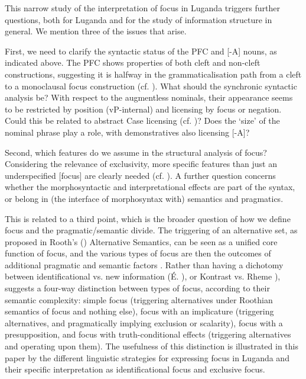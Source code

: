 \documentclass[output=paper]{langsci/langscibook}
\begin{document}
This narrow study of the interpretation of focus in Luganda triggers further questions, both for Luganda and for the study of information structure in general. We mention three of the issues that arise.

First, we need to clarify the syntactic status of the PFC and [-A] nouns, as indicated above. The PFC shows properties of both cleft and non-cleft constructions, suggesting it is halfway in the grammaticalisation path from a cleft to a monoclausal focus construction (cf. \citealt{HeineReh1983,HarrisCampbell1995,VanderWalManiacky2015}). What should the synchronic syntactic analysis be? With respect to the augmentless nominals, their appearance seems to be restricted by position (vP-internal) and licensing by focus or negation. Could this be related to abstract Case licensing (cf. \citealt{Halpert2012,Halpert2013,CarstensMletshe2013,CarstensMletshe2015})? Does the ‘size’ of the nominal phrase play a role, with demonstratives also licensing [-A]?

Second, which features do we assume in the structural analysis of focus? Considering the relevance of exclusivity, more specific features than just an underspecified [focus] are clearly needed (cf. \citealt{NeelemanEtAl2009}). A further question concerns whether the morphosyntactic and interpretational effects are part of the syntax, or belong in (the interface of morphosyntax with) semantics and pragmatics.

This is related to a third point, which is the broader question of how we define focus and the pragmatic/semantic divide. The triggering of an alternative set, as proposed in Rooth’s (\citeyear*{Rooth1985,Rooth1992,Rooth1996}) Alternative Semantics, can be seen as a unified core function of focus, and the various types of focus are then the outcomes of additional pragmatic and semantic factors \citep{ZimmermannOnea2011}. Rather than having a dichotomy between identificational vs. new information (É. \citealt{Kiss1998}), or Kontrast vs. Rheme \citep{VallduviVilkuna1998}), \citet{Bazalgette2015} suggests a four-way distinction between types of focus, according to their semantic complexity: simple focus (triggering alternatives under Roothian semantics of focus and nothing else), focus with an implicature (triggering alternatives, and pragmatically implying exclusion or scalarity), focus with a presupposition, and focus with truth-conditional effects (triggering alternatives and operating upon them). The usefulness of this distinction is illustrated in this paper by the different linguistic strategies for expressing focus in Luganda and their specific interpretation as identificational focus and exclusive focus.
\end{document}
